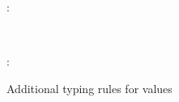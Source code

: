 \begin{figure}
\flushleft \shadebox{$\Gamma \vdash \delta: \Delta$}
\begin{smathpar}
   {
      \Gamma \vdash \delta: \Delta
   }
\end{smathpar}
\\[5mm]
\flushleft {}
\begin{smathpar}
{
   \vdash \exClosure{\rho}{\delta}{\sigma}: 
}
\end{smathpar}
\caption{Additional typing rules for values}
\end{figure}
